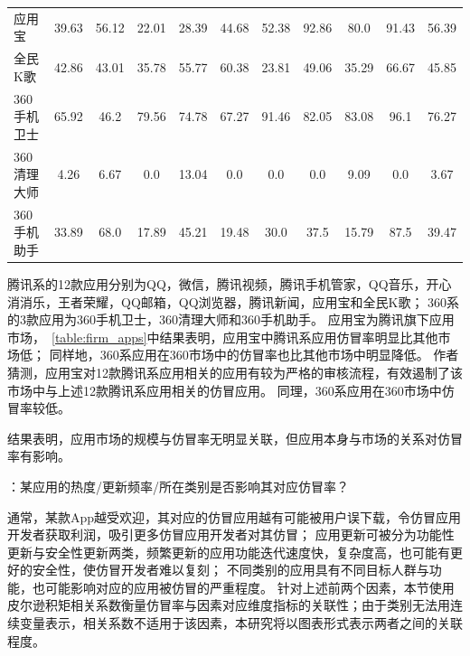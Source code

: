 \begin{table}[htbp]
\begin{tabular}{l c c c c c c c c c c}
        应用宝                          & 39.63      & 56.12          & 22.01        & 28.39        & 44.68     & 52.38        & 92.86      & 80.0       & 91.43      & 56.39    \\
        \rowcolor{gray!15} 全民K歌      & 42.86      & 43.01          & 35.78        & 55.77        & 60.38     & 23.81        & 49.06      & 35.29      & 66.67      & 45.85    \\
        360手机卫士                     & 65.92      & 46.2           & 79.56        & 74.78        & 67.27     & 91.46        & 82.05      & 83.08      & 96.1       & 76.27    \\
        \rowcolor{gray!15} 360清理大师  & 4.26       & 6.67           & 0.0          & 13.04        & 0.0       & 0.0          & 0.0        & 9.09       & 0.0        & 3.67     \\
        360手机助手                     & 33.89      & 68.0           & 17.89        & 45.21        & 19.48     & 30.0         & 37.5       & 15.79      & 87.5       & 39.47    \\
        \bottomrule
    \end{tabular}
    \label{table:firm_apps}
\end{table}

腾讯系的12款应用分别为QQ，微信，腾讯视频，腾讯手机管家，QQ音乐，开心消消乐，王者荣耀，QQ邮箱，QQ浏览器，腾讯新闻，应用宝和全民K歌；
360系的3款应用为360手机卫士，360清理大师和360手机助手。
应用宝为腾讯旗下应用市场，~\autoref{table:firm_apps}中结果表明，应用宝中腾讯系应用仿冒率明显比其他市场低；
同样地，360系应用在360市场中的仿冒率也比其他市场中明显降低。
作者猜测，应用宝对12款腾讯系应用相关的应用有较为严格的审核流程，有效遏制了该市场中与上述12款腾讯系应用相关的仿冒应用。
同理，360系应用在360市场中仿冒率较低。

结果表明，应用市场的规模与仿冒率无明显关联，但应用本身与市场的关系对仿冒率有影响。

：某应用的热度/更新频率/所在类别是否影响其对应仿冒率？

通常，某款App越受欢迎，其对应的仿冒应用越有可能被用户误下载，令仿冒应用开发者获取利润，吸引更多仿冒应用开发者对其仿冒；
应用更新可被分为功能性更新与安全性更新两类，频繁更新的应用功能迭代速度快，复杂度高，也可能有更好的安全性，使仿冒开发者难以复刻；
不同类别的应用具有不同目标人群与功能，也可能影响对应的应用被仿冒的严重程度。
针对上述前两个因素，本节使用皮尔逊积矩相关系数衡量仿冒率与因素对应维度指标的关联性；由于类别无法用连续变量表示，相关系数不适用于该因素，本研究将以图表形式表示两者之间的关联程度。

